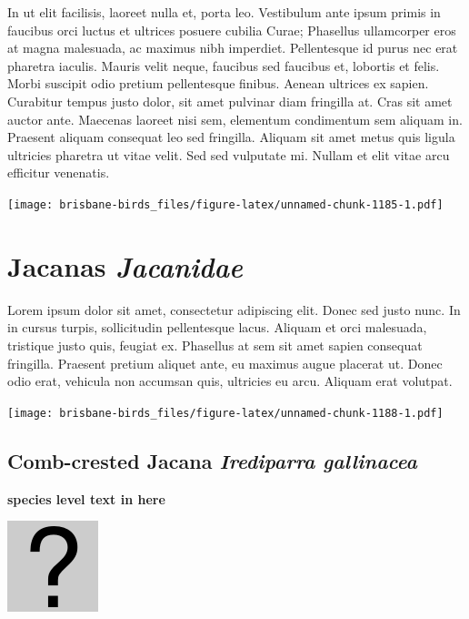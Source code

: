 \documentclass[]{book}
\let\origfigure\figure
\let\endorigfigure\endfigure
\renewenvironment{figure}[1][2] {
  \expandafter\origfigure\expandafter[H]
} {
  \endorigfigure
}
\begin{document}
In ut elit facilisis, laoreet nulla et, porta leo. Vestibulum ante ipsum
primis in faucibus orci luctus et ultrices posuere cubilia Curae;
Phasellus ullamcorper eros at magna malesuada, ac maximus nibh
imperdiet. Pellentesque id purus nec erat pharetra iaculis. Mauris velit
neque, faucibus sed faucibus et, lobortis et felis. Morbi suscipit odio
pretium pellentesque finibus. Aenean ultrices ex sapien. Curabitur
tempus justo dolor, sit amet pulvinar diam fringilla at. Cras sit amet
auctor ante. Maecenas laoreet nisi sem, elementum condimentum sem
aliquam in. Praesent aliquam consequat leo sed fringilla. Aliquam sit
amet metus quis ligula ultricies pharetra ut vitae velit. Sed sed
vulputate mi. Nullam et elit vitae arcu efficitur venenatis.

\begin{figure}
\centering
\texttt{[image: brisbane-birds\_files/figure-latex/unnamed-chunk-1185-1.pdf]}
\caption{\label{fig:unnamed-chunk-1185}insert figure caption}
\end{figure}

\chapter{\texorpdfstring{Jacanas
\emph{Jacanidae}}{Jacanas Jacanidae}}\label{jacanas-jacanidae}

Lorem ipsum dolor sit amet, consectetur adipiscing elit. Donec sed justo
nunc. In in cursus turpis, sollicitudin pellentesque lacus. Aliquam et
orci malesuada, tristique justo quis, feugiat ex. Phasellus at sem sit
amet sapien consequat fringilla. Praesent pretium aliquet ante, eu
maximus augue placerat ut. Donec odio erat, vehicula non accumsan quis,
ultricies eu arcu. Aliquam erat volutpat.

\texttt{[image: brisbane-birds\_files/figure-latex/unnamed-chunk-1188-1.pdf]}

\section{\texorpdfstring{Comb-crested Jacana \emph{Irediparra
gallinacea}}{Comb-crested Jacana Irediparra gallinacea}}\label{comb-crested-jacana-irediparra-gallinacea}

\textbf{species level text in here}

\begin{figure}
\centering
\includegraphics{assets/missing.png}
\caption{No image for species}
\end{figure}
\end{document}
